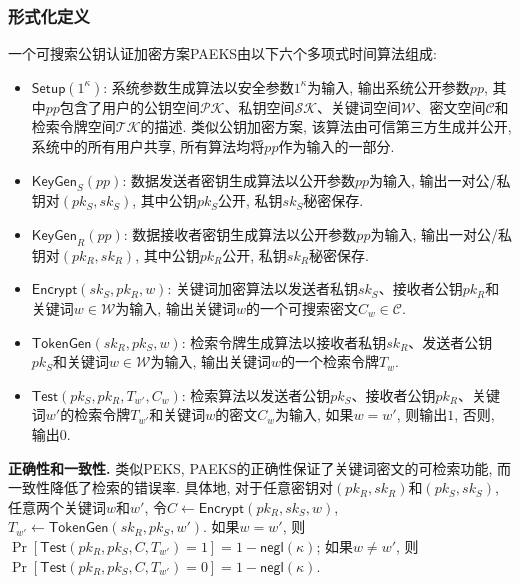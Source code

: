 \subsubsection{形式化定义}
\begin{definition} [可搜索公钥认证加密]
一个可搜索公钥认证加密方案PAEKS由以下六个多项式时间算法组成: 
\begin{itemize}
\item $\mathsf{Setup}(1^\kappa)$: 系统参数生成算法以安全参数$1^\kappa$为输入, 输出系统公开参数$pp$, 其中$pp$包含了用户的公钥空间$\mathcal{PK}$、私钥空间$\mathcal{SK}$、关键词空间$\mathcal{W}$、密文空间$\mathcal{C}$和检索令牌空间$\mathcal{TK}$的描述. 类似公钥加密方案, 该算法由可信第三方生成并公开, 系统中的所有用户共享, 所有算法均将$pp$作为输入的一部分.

\item $\mathsf{KeyGen}_S(pp)$: 数据发送者密钥生成算法以公开参数$pp$为输入, 输出一对公/私钥对$(pk_S, sk_S)$, 其中公钥$pk_S$公开, 私钥$sk_S$秘密保存.

\item $\mathsf{KeyGen}_R(pp)$: 数据接收者密钥生成算法以公开参数$pp$为输入, 输出一对公/私钥对$(pk_R, sk_R)$, 其中公钥$pk_R$公开, 私钥$sk_R$秘密保存.

\item $\mathsf{Encrypt}(sk_S, pk_R, w)$: 关键词加密算法以发送者私钥$sk_S$、接收者公钥$pk_R$和关键词$w \in \mathcal{W}$为输入, 输出关键词$w$的一个可搜索密文$C_w \in \mathcal{C}$.

\item $\mathsf{TokenGen}(sk_R, pk_S, w)$: 检索令牌生成算法以接收者私钥$sk_R$、发送者公钥$pk_S$和关键词$w \in \mathcal{W}$为输入, 输出关键词$w$的一个检索令牌$T_w$.

\item $\mathsf{Test}(pk_S, pk_R, T_{w'}, C_w)$: 检索算法以发送者公钥$pk_S$、接收者公钥$pk_R$、关键词$w'$的检索令牌$T_{w'}$和关键词$w$的密文$C_w$为输入, 如果$w = w'$, 则输出$1$, 否则, 输出$0$.
\end{itemize}
\end{definition}

\begin{trivlist}
\item \textbf{正确性和一致性.} 类似PEKS, PAEKS的正确性保证了关键词密文的可检索功能, 而一致性降低了检索的错误率. 具体地, 对于任意密钥对$(pk_R, sk_R)$和$(pk_S, sk_S)$, 任意两个关键词$w$和$w'$, 令$C \leftarrow \mathsf{Encrypt}(pk_R, sk_S, w)$, $T_{w'} \leftarrow \mathsf{TokenGen}(sk_R, pk_S, w')$. 如果$w=w'$, 则$\Pr\left[\mathsf{Test}(pk_R, pk_S, C, T_{w'})=1 \right] = 1 - \mathsf{negl}(\kappa)$; 如果$w \neq w'$, 则$\Pr\left[\mathsf{Test}(pk_R, pk_S, C, T_{w'})=0 \right] =1 - \mathsf{negl}(\kappa)$. 
\end{trivlist}

